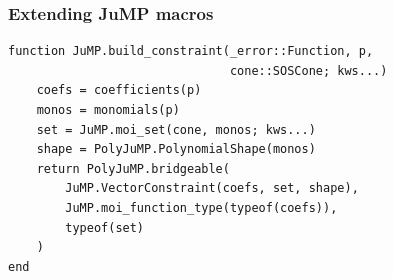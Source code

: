 \documentclass{beamer}
\begin{document}
\begin{frame}[fragile]
  \frametitle{Extending JuMP macros}
\begin{verbatim}
function JuMP.build_constraint(_error::Function, p,
                               cone::SOSCone; kws...)
    coefs = coefficients(p)
    monos = monomials(p)
    set = JuMP.moi_set(cone, monos; kws...)
    shape = PolyJuMP.PolynomialShape(monos)
    return PolyJuMP.bridgeable(
        JuMP.VectorConstraint(coefs, set, shape),
        JuMP.moi_function_type(typeof(coefs)),
        typeof(set)
    )
end
\end{verbatim}
\end{frame}

\end{document}
